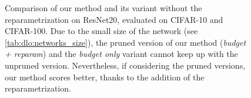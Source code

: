 \begin{figure}
  \centering
  \caption{Comparison of our method and its variant without the
    reparametrization on ResNet20, evaluated on CIFAR-10 and CIFAR-100. Due to the
    small size of the network (see \cref{tab:dlo:networks_size}), the pruned
    version of our method (\emph{budget + reparam}) and the \emph{budget only}
    variant cannot keep up with the unpruned version. Nevertheless, if considering
    the pruned versions, our method scores better, thanks to the addition of the
    reparametrization.}
  \label{fig:chap1:budget_only_resnet20}
\end{figure}

